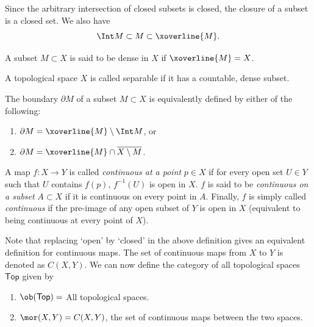 Since the arbitrary intersection of closed subsets is closed, the closure of a subset is a closed set. We also have
\begin{equation}
\Int M \subset M \subset \xoverline{M}.
\end{equation}

\begin{defn}
A subset $M\subset X$ is said to be dense in $X$ if $\xoverline{M} = X$.
\end{defn}

\begin{defn}[Separability]
A topological space $X$ is called separable if it has a countable, dense subset.
\end{defn}

\begin{defn}[Boundary]
The boundary $\partial M$ of a subset $M\subset X$ is equivalently defined by either of the following:
\begin{enumerate}
    \item $\partial M = \xoverline{M} \setminus \Int M$, or
    \item $\partial M = \xoverline{M} \cap \overline{X\setminus M}$.
\end{enumerate}
\end{defn}

\begin{defn}
A map $f:X\rightarrow Y$ is called \emph{continuous at a point} $p\in X$ if for every open set $U\in Y$ such that $U$ contains $f(p)$, $f^{-1}(U)$ is open in $X$. $f$ is said to be \emph{continuous on a subset} $A\subset X$ if it is continuous on every point in $A$. Finally, $f$ is simply called \emph{continuous} if the pre-image of any open subset of $Y$ is open in $X$ (equivalent to being continuous at every point of $X$).
\end{defn}

Note that replacing `open' by `closed' in the above definition gives an equivalent definition for continuous maps. The set of continuous maps from $X$ to $Y$ is denoted as $C(X,Y)$. We can now define the category of all topological spaces $\mathsf{Top}$ given by
\begin{enumerate}
    \item $\ob(\mathsf{Top})=$ All topological spaces.
    \item $\mor(X,Y) = C(X,Y)$, the set of continuous maps between the two spaces.
\end{enumerate}

